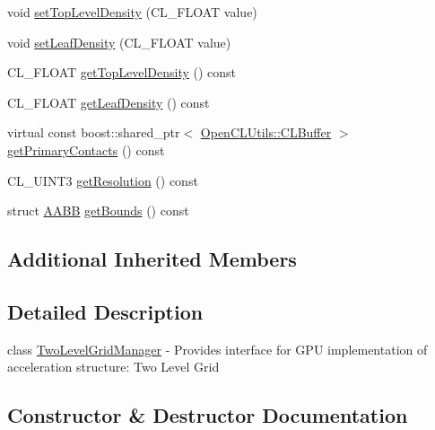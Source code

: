 \begin{DoxyCompactItemize}
\item 
void \hyperlink{class_c_l_ray_tracer_1_1_acceleration_structures_1_1_two_level_grid_manager_a8781999cec61fa55d570ed5cfcafa9b0}{set\+Top\+Level\+Density} (C\+L\+\_\+\+F\+L\+O\+AT value)
\item 
void \hyperlink{class_c_l_ray_tracer_1_1_acceleration_structures_1_1_two_level_grid_manager_a22293999d15138ef66661198a926d716}{set\+Leaf\+Density} (C\+L\+\_\+\+F\+L\+O\+AT value)
\item 
C\+L\+\_\+\+F\+L\+O\+AT \hyperlink{class_c_l_ray_tracer_1_1_acceleration_structures_1_1_two_level_grid_manager_a91ff6c8c8bf49f0a1c6f474d71bd1f35}{get\+Top\+Level\+Density} () const 
\item 
C\+L\+\_\+\+F\+L\+O\+AT \hyperlink{class_c_l_ray_tracer_1_1_acceleration_structures_1_1_two_level_grid_manager_ae6a04da5ee4f28eb5402499c9055e1c7}{get\+Leaf\+Density} () const 
\item 
virtual const boost\+::shared\+\_\+ptr$<$ \hyperlink{class_c_l_ray_tracer_1_1_open_c_l_utils_1_1_c_l_buffer}{Open\+C\+L\+Utils\+::\+C\+L\+Buffer} $>$ \hyperlink{class_c_l_ray_tracer_1_1_acceleration_structures_1_1_two_level_grid_manager_ac9a677d9c2085971cd4ba758ef4be43c}{get\+Primary\+Contacts} () const 
\item 
C\+L\+\_\+\+U\+I\+N\+T3 \hyperlink{class_c_l_ray_tracer_1_1_acceleration_structures_1_1_two_level_grid_manager_a2dd1f43ec8af99c8a4fc93fcb0cab5dd}{get\+Resolution} () const 
\item 
struct \hyperlink{struct_a_a_b_b}{A\+A\+BB} \hyperlink{class_c_l_ray_tracer_1_1_acceleration_structures_1_1_two_level_grid_manager_a26228fa56e267cf336cfe26e1b278f73}{get\+Bounds} () const 
\end{DoxyCompactItemize}
\subsection*{Additional Inherited Members}


\subsection{Detailed Description}
class \hyperlink{class_c_l_ray_tracer_1_1_acceleration_structures_1_1_two_level_grid_manager}{Two\+Level\+Grid\+Manager} -\/ Provides interface for G\+PU implementation of acceleration structure\+: Two Level Grid 

\subsection{Constructor \& Destructor Documentation}
